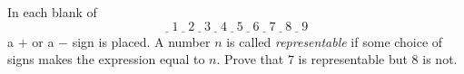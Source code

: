 In each blank of
\[
\underline{\ \ }\,1\,\underline{\ \ }\,2\,\underline{\ \ }\,3\,\underline{\ \ }\,4\,\underline{\ \ }\,5\,\underline{\ \ }\,6\,\underline{\ \ }\,7\,\underline{\ \ }\,8\,\underline{\ \ }\,9
\]
a $+$ or a $-$ sign is placed. A number $n$ is called \emph{representable} if some choice of signs makes the expression equal to $n$. Prove that $7$ is representable but $8$ is not.
